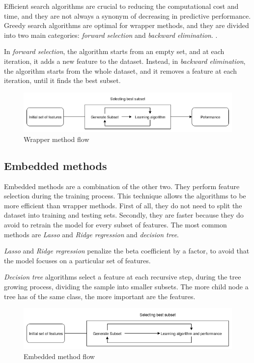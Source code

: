 Efficient search algorithms are crucial to reducing the computational cost and time, and they are not always a synonym of decreasing in predictive performance. Greedy search algorithms are optimal for wrapper methods, and they are divided into two main categories: \textit{forward selection} and \textit{backward elimination}. \cite{reunanen2003overfitting}.

In \textit{forward selection}, the algorithm starts from an empty set, and at each iteration, it adds a new feature to the dataset. Instead, in \textit{backward elimination}, the algorithm starts from the whole dataset, and it removes a feature at each iteration, until it finds the best subset.

\begin{figure}[!h]
	\centering
	\includegraphics[width=1.0\columnwidth]{wrapper}
	\caption{Wrapper method flow}
	\label{fig:wrapper}
\end{figure}



\subsection{Embedded methods}

Embedded methods are a combination of the other two. They perform feature selection during the training process. \cite{guyon2003introduction} This technique allows the algorithms to be more efficient than wrapper methods. First of all, they do not need to split the dataset into training and testing sets. Secondly, they are faster because they do avoid to retrain the model for every subset of features.
The most common methods are \textit{Lasso} and \textit{Ridge regression} and \textit{decision tree}.

\textit{Lasso} and \textit{Ridge regression} penalize the beta coefficient by a factor, to avoid that the model focuses on a particular set of features.

\textit{Decision tree }algorithms select a feature at each recursive step, during the tree growing process, dividing the sample into smaller subsets. The more child node a tree has of the same class, the more important are the features.

\begin{figure}[!h]
	\centering
	\includegraphics[width=1.0\columnwidth]{embedded}
	\caption{Embedded method flow}
	\label{fig:embedded}
\end{figure}